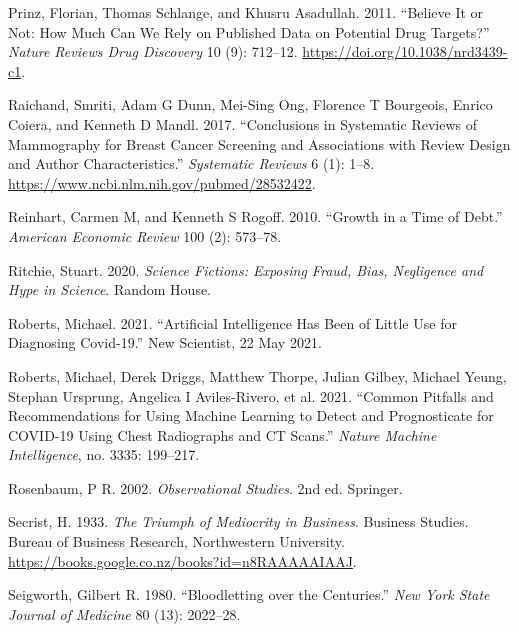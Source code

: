 \documentclass[
  10pt,
  b5paper]{book}
\newlength{\cslhangindent}
\newlength{\cslentryspacingunit} %
\newenvironment{CSLReferences}[2] %
 {%
  \setlength{\parindent}{0pt}
  \ifodd #1
  \let\oldpar\par
  \def\par{\hangindent=\cslhangindent\oldpar}
  \fi
  \setlength{\parskip}{#2\cslentryspacingunit}
 }%
 {}
\begin{document}
\begin{CSLReferences}{1}{0}
\leavevmode{}%
Prinz, Florian, Thomas Schlange, and Khusru Asadullah. 2011. {``Believe It or Not: How Much Can We Rely on Published Data on Potential Drug Targets?''} \emph{Nature Reviews Drug Discovery} 10 (9): 712--12. \url{https://doi.org/10.1038/nrd3439-c1}.

\leavevmode{}%
Raichand, Smriti, Adam G Dunn, Mei-Sing Ong, Florence T Bourgeois, Enrico Coiera, and Kenneth D Mandl. 2017. {``Conclusions in Systematic Reviews of Mammography for Breast Cancer Screening and Associations with Review Design and Author Characteristics.''} \emph{Systematic Reviews} 6 (1): 1--8. \url{https://www.ncbi.nlm.nih.gov/pubmed/28532422}.

\leavevmode{}%
Reinhart, Carmen M, and Kenneth S Rogoff. 2010. {``Growth in a Time of Debt.''} \emph{American Economic Review} 100 (2): 573--78.

\leavevmode{}%
Ritchie, Stuart. 2020. \emph{Science Fictions: Exposing Fraud, Bias, Negligence and Hype in Science}. Random House.

\leavevmode{}%
Roberts, Michael. 2021. {``Artificial Intelligence Has Been of Little Use for Diagnosing Covid-19.''} New Scientist, 22 May 2021.

\leavevmode{}%
Roberts, Michael, Derek Driggs, Matthew Thorpe, Julian Gilbey, Michael Yeung, Stephan Ursprung, Angelica I Aviles-Rivero, et al. 2021. {``Common Pitfalls and Recommendations for Using Machine Learning to Detect and Prognosticate for COVID-19 Using Chest Radiographs and CT Scans.''} \emph{Nature Machine Intelligence}, no. 3335: 199--217.

\leavevmode{}%
Rosenbaum, P R. 2002. \emph{Observational Studies}. 2nd ed. Springer.

\leavevmode{}%
Secrist, H. 1933. \emph{The Triumph of Mediocrity in Business}. Business Studies. Bureau of Business Research, Northwestern University. \url{https://books.google.co.nz/books?id=n8RAAAAAIAAJ}.

\leavevmode{}%
Seigworth, Gilbert R. 1980. {``Bloodletting over the Centuries.''} \emph{New York State Journal of Medicine} 80 (13): 2022--28.


\end{CSLReferences}
\end{document}
